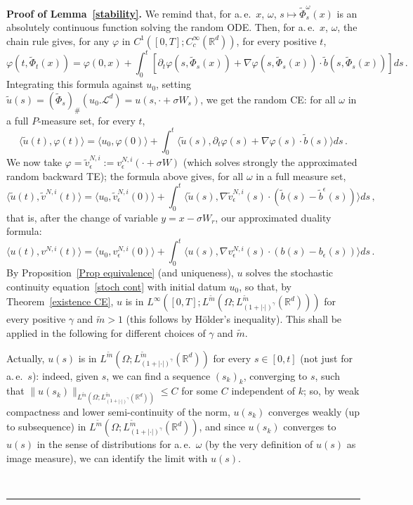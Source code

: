 \documentclass[a4paper,10pt]{article}
\newenvironment{proof}[1][Proof]{\noindent\textbf{#1.} }{\ \rule{0.5em}{0.5em}}
\newcommand{\mr}{\mathbb{R}}
\newcommand{\mc}{\mathcal}
\newcommand{\lan}{\langle}
\newcommand{\ran}{\rangle}
\newcommand{\td}{\tilde}
\newcommand{\eps}{\epsilon}
\begin{document}
\begin{proof}[Proof of Lemma~\ref{stability}]
We remind that, for a.\,e.\ $x$, $\omega$, $s\mapsto\td{\Phi}_s^\omega(x)$ is an absolutely continuous function solving the random ODE. Then, for a.\,e.\ $x$, $\omega$, the chain rule gives, for any $\varphi$ in $C^1([0,T];C^\infty_c(\mr^d))$, for every positive $t$,
\begin{equation*}
\varphi(t,\td{\Phi}_t(x))=\varphi(0,x)+\int^t_0[\partial_t\varphi(s,\td{\Phi}_s(x))+\nabla\varphi(s,\td{\Phi}_s(x))\cdot\td{b}(s,\td{\Phi}_s(x))]ds \,.
\end{equation*}
Integrating this formula against $u_0$, setting $\td{u}(s)=(\td{\Phi}_s)_\#(u_0.\mc{L}^d)=u(s,\cdot+\sigma W_s)$, we get the random CE: for all $\omega$ in a full $P$-measure set, for every $t$,
\begin{equation*}
\lan \td{u}(t),\varphi(t)\ran= \lan u_0,\varphi(0)\ran +\int^t_0\lan\td{u}(s),\partial_t\varphi(s)+\nabla\varphi(s)\cdot\td{b}(s)\ran ds \,.
\end{equation*}
We now take $\varphi=\td{v}^{N,i}_\eps:=v^{N,i}_\eps(\cdot+\sigma W)$ (which solves strongly the approximated random backward TE); the formula above gives, for all $\omega$ in a full measure set,
\begin{equation*}
\lan \td{u}(t),\td{v}^{N,i}(t)\ran= \lan u_0,\td{v}^{N,i}_\eps(0) \ran +\int^t_0\lan\td{u}(s),\nabla\td{v}^{N,i}_\eps(s) \cdot(\td{b}(s)-\td{b}^\eps(s))\ran ds \,,
\end{equation*}
that is, after the change of variable $y=x-\sigma W_r$, our approximated duality formula:
\begin{equation}
\lan u(t),v^{N,i}(t)\ran= \lan u_0,v^{N,i}_\eps(0) \ran +\int^t_0\lan u(s),\nabla v^{N,i}_\eps(s) \cdot(b(s)-b_\eps(s))\ran ds \,.\label{approxdual2}
\end{equation}
By Proposition~\ref{Prop equivalence} (and uniqueness), $u$ solves the stochastic continuity equation~\eqref{stoch cont} with initial datum $u_0$, so that, by Theorem~\ref{existence CE}, $u$ is in $L^\infty([0,T];L^{\td{m}}(\Omega;L^{\td{m}}_{(1+|\cdot|)^\gamma}(\mr^d)))$ for every positive $\gamma$ and $\td{m} > 1$ (this follows by H\"older's inequality). This shall be applied in the following for different choices of $\gamma$ and $\td{m}$.

Actually, $u(s)$ is in $L^{\td{m}}(\Omega;L^{\td{m}}_{(1+|\cdot|)^\gamma}(\mr^d))$ for every $s\in [0,t]$ (not just for a.\,e.\ $s$): indeed, given $s$, we can find a sequence $(s_k)_k$, converging to $s$, such that $\|u(s_k)\|_{L^{\td{m}}(\Omega;L^{\td{m}}_{(1+|\cdot|)^\gamma}(\mr^d))}\le C$ for some $C$ independent of $k$; so, by weak compactness and lower semi-continuity of the norm, $u(s_k)$ converges weakly (up to subsequence) in $L^{\td{m}}(\Omega;L^{\td{m}}_{(1+|\cdot|)^\gamma}(\mr^d))$, and since $u(s_k)$ converges to $u(s)$ in the sense of distributions for a.\,e.\ $\omega$ (by the very definition of $u(s)$ as image measure), we can identify the limit with $u(s)$.


\end{proof}
\end{document}
